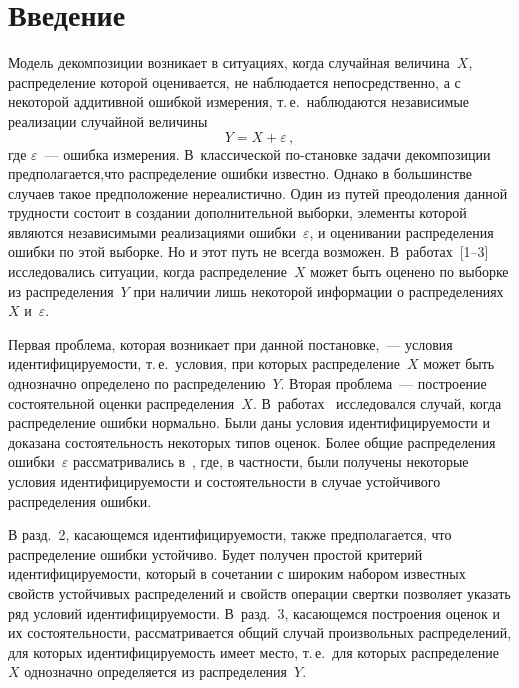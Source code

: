       \begin{multicols}{2}
      
            \label{st\stat}

\section{Введение}

Модель декомпозиции возникает в ситуациях, когда случайная величина~$X$, 
распределение которой оценивается, не наблюдается
непосредственно, а с некоторой аддитивной ошибкой измерения, т.\,е.\
наблюдаются независимые реализации случайной величины
\begin{equation}
Y=X+\varepsilon\,,\label{e1-us}
\end{equation}
где $\varepsilon$~--- ошибка измерения. В~классической по-\linebreak становке
задачи декомпозиции предполагается,\linebreak что распределение ошибки
известно. Однако в большинстве случаев такое предположение
нереалистично. Один из путей преодоления данной труд\-ности состоит в
создании дополнительной выборки, элементы которой являются
независимыми реализациями ошибки~$\varepsilon$, и оценивании
распределения ошибки по этой выборке. Но и этот путь не всегда
возможен. В~работах~[1--3] исследовались ситуации, когда
распределение~$X$ может быть оценено по выборке из распределения~$Y$
при наличии лишь некоторой информации о распределениях~$X$ и~$\varepsilon$.

Первая проблема, которая возникает при данной постановке,~--- условия
идентифицируемости, т.\,е.\ условия, при которых распределение~$X$
может быть однозначно определено по распределению~$Y$. Вторая
проблема~--- построение состоятельной оценки распределения~$X$. 
В~работах~\cite{1-us, 2-us} исследовался случай, когда распределение ошибки
нормально. Были даны условия иден\-ти\-фи\-ци\-ру\-емости и доказана
состоятельность некоторых типов оценок. Более общие распределения
ошибки~$\varepsilon$ рассматривались в~\cite{3-us}, где, в част\-ности, были
получены некоторые условия идентифицируемости и состоятельности в
случае устойчивого распределения ошибки.

В разд.~2, касающемся иден\-ти\-фи\-ци\-ру\-емости,
также предполагается, что распределение ошибки устойчиво. Будет
получен простой критерий идентифицируемости, который в сочетании с
широким набором известных свойств устойчивых распределений и свойств
операции свертки позволяет указать ряд условий идентифицируемости. 
В~разд.~3, ка\-са\-ющем\-ся построения оценок и их со\-сто\-ятель\-ности,
рас\-смат\-ри\-ва\-ет\-ся общий случай про\-из\-вольных распределений, для которых
идентифицируемость имеет мес\-то, т.\,е.\ для которых распределение~$X$
однозначно определяется из распределения~$Y$.



\end{multicols}
